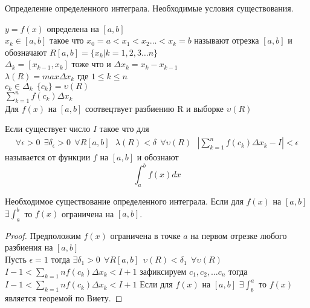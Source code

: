 \begin{title}
  Определение определенного интеграла. Необходимые условия существования.
\end{title}

$y = f(x)$ определена на $[a,b]$\\
$x_k \in [a,b]$ такое что $x_0 = a < x_1 < x_2 \ldots < x_k = b$ называют
 отрезка $[a,b]$ и обозначают $R[a,b] =
\{x_k | k = 1,2,3 \ldots n\}$\\
$\Delta_k = [x_{k-1}, x_k]$ тоже что и $\Delta{x_k} = x_k - x_{k-1}$\\
$\lambda(R) = max\Delta x_k$ где $1 \le k \le n$ \\
$c_k \in \Delta_k ~~ \{c_k\} = \upsilon(R)$ \\
$\sum_{k=1}^{n} f(c_k)\Delta x_k$ \\

Для $f(x)$ на $[a,b]$ соотвецтвует разбиению R и выборке $\upsilon(R)$\\

\begin{defin}
  Если существует число $I$ такое что для
  \begin{eqnarray*}
    \forall\epsilon>0 ~~ \exists\delta_{\epsilon}>0 ~~ \forall R[a,b] ~~~
    \lambda(R)<\delta ~~ \forall\upsilon(R) ~~~
    \left| \sum_{k=1}^{n} f(c_k)\Delta x_k - I \right| < \epsilon
  \end{eqnarray*}
  называется  от функции $f$ на $[a,b]$ и обознают
  $$\int_{a}^{b} f(x)dx$$
\end{defin}

\begin{theorem}
  Необходимое существование определенного интеграла. Если для $f(x)$ на $[a,b]$
  $\exists \int_{a}^{b}$ то $f(x)$ ограничена на $[a,b]$.
\end{theorem}

\begin{proof}
  Предположим $f(x)$ ограничена в точке $a$ на первом отрезке любого разбиения
  на $[a,b]$\\
  Пусть $\epsilon = 1$ тогда $\exists \delta_1 > 0 ~~ \forall R[a,b] ~~
  \upsilon(R) < \delta_1 ~~ \forall \upsilon(R)$
  $I-1 < \sum_{k=1}{n}f(c_k)\Delta x_k < I+1$ зафиксируем $c_1, c_2, \ldots c_n$
  тогда $I-1 < \sum_{k=1}{n}f(c_k)\Delta x_k < I+1$
  Если для $f(x)$ на $[a,b]$ $\exists \int_{b}^{a}$ то $f(x)$
  является теоремой по Виету.
\end{proof}